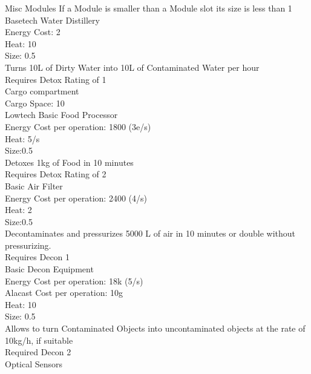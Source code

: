\documentclass{article}
\begin{document}
    Misc Modules\newline
    If a Module is smaller than a Module slot its size is less than 1
    \newline
    Basetech \newline
    Water Distillery \\
    Energy Cost: 2\\
    Heat: 10\\
    Size: 0.5\\
    Turns 10L of Dirty Water into 10L of Contaminated Water per hour\\
    Requires Detox Rating of 1\\
    \newline
    Cargo compartment\\
    Cargo Space: 10 \\
    \newline
    Lowtech \newline
    Basic Food Processor\\
    Energy Cost per operation: 1800 (3e/s)\\
    Heat: 5/s \\
    Size:0.5\\
    Detoxes 1kg of Food in 10 minutes \\
    Requires Detox Rating of 2\\
    \newline
    Basic Air Filter\\
    Energy Cost per operation: 2400 (4/s)\\
    Heat: 2\\
    Size:0.5\\
    Decontaminates and pressurizes 5000 L of air in  10 minutes or double without pressurizing. \\
    Requires Decon 1\\
    \newline
    Basic Decon Equipment \\
    Energy Cost per operation: 18k (5/s)\\
    Alacast Cost per operation: 10g\\
    Heat: 10 \\
    Size: 0.5\\
    Allows to turn Contaminated Objects into uncontaminated objects at the rate of 10kg/h, if suitable\\
    Required Decon 2\\
    \newline
    Optical Sensors\\
\end{document}
